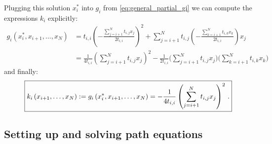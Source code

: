 \documentclass[a4paper,10pt]{article}
\begin{document}
Plugging this solution $x_i^*$ into $g_i$ from \eqref{eq:general_partial_gi}
we can compute the expressions $k_i$ explicitly:
\begin{equation*}
\begin{split}
  g_i(x_i^*, x_{i+1}, \ldots, x_N)
  & =
  t_{i,i} \left(
    - \frac{ \sum_{j=i+1}^{N} t_{i,j} x_j }{ 2 t_{i,i} }
  \right)^2
  + \sum_{j=i+1}^{N} t_{i,j} \left(
                                   - \frac{ \sum_{k=i+1}^{N} t_{i,k} x_k }{ 2 t_{i,i} }
                             \right) x_j \\
  & =
  \frac{1}{4 t_{i,i}}
  \left( \sum_{j=i+1}^{N} t_{i,j} x_j \right)^2
  - \frac{1}{2 t_{i,i}} \Biggl(\sum_{j=i+1}^{N} t_{i,j} x_j\Biggr) \Biggl(\sum_{k=i+1}^{N} t_{i,k} x_k\Biggr)
\end{split}
\end{equation*}
and finally:
\begin{equation} \label{eq:general_ki}
\boxed{
  k_i\left(x_{i+1}, \ldots, x_N\right)
  :=
  g_i\left(x_i^*, x_{i+1}, \ldots, x_N\right) = - \frac{1}{4 t_{i,i}} \left( \sum_{j=i+1}^{N} t_{i,j} x_j \right)^2 \,.
}
\end{equation}


\subsection{Setting up and solving path equations}
\end{document}
